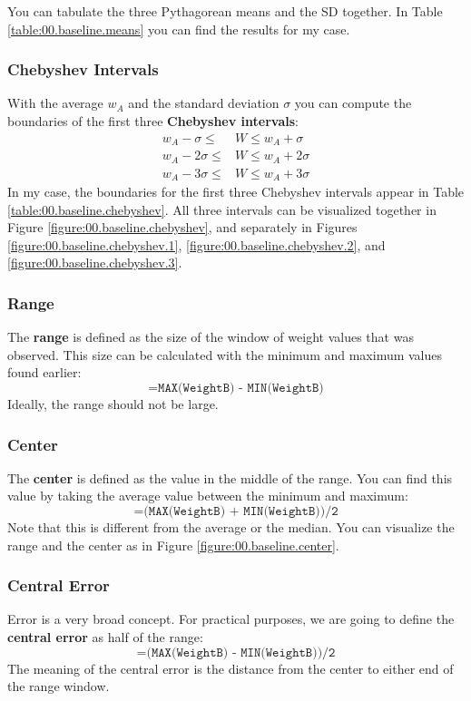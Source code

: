 You can tabulate the three Pythagorean means and the SD together. In Table \ref{table:00.baseline.means} you can find the results for my case.
%
\subsubsection{Chebyshev Intervals}
%
With the average $w_{A}$ and the standard deviation $\sigma$ you can compute the boundaries of the first three \textbf{Chebyshev intervals}:
\begin{align}
    w_{A} - \sigma \leq {}&W \leq w_{A} + \sigma \\
    w_{A} - 2\sigma \leq {}&W \leq w_{A} + 2\sigma \\
    w_{A} - 3\sigma \leq {}&W \leq w_{A} + 3\sigma
\end{align}
In my case, the boundaries for the first three Chebyshev intervals appear in Table \ref{table:00.baseline.chebyshev}. All three intervals can be visualized together in Figure \ref{figure:00.baseline.chebyshev}, and separately in Figures \ref{figure:00.baseline.chebyshev.1}, \ref{figure:00.baseline.chebyshev.2}, and \ref{figure:00.baseline.chebyshev.3}.
%
\subsubsection{Range}
%
The \textbf{range} is defined as the size of the window of weight values that was observed. This size can be calculated with the minimum and maximum values found earlier:
\begin{equation}
    \texttt{=MAX(WeightB) - MIN(WeightB)}
\end{equation}
Ideally, the range should not be large.
%
\subsubsection{Center}
%
The \textbf{center} is defined as the value in the middle of the range. You can find this value by taking the average value between the minimum and maximum:
\begin{equation}
    \texttt{=(MAX(WeightB) + MIN(WeightB))/2}
\end{equation}
Note that this is different from the average or the median. You can visualize the range and the center as in Figure \ref{figure:00.baseline.center}.
%
\subsubsection{Central Error}
%
Error is a very broad concept. For practical purposes, we are going to define the \textbf{central error} as half of the range:
\begin{equation}
    \texttt{=(MAX(WeightB) - MIN(WeightB))/2}
    \label{eq:00.error}
\end{equation}
The meaning of the central error is the distance from the center to either end of the range window.

